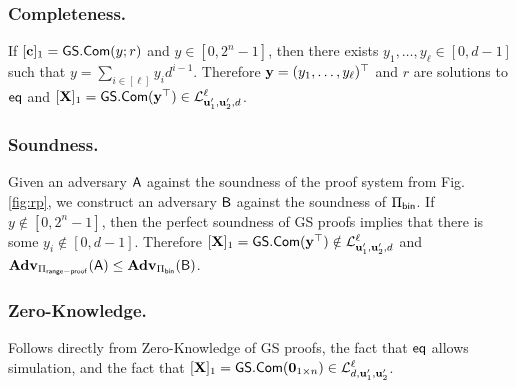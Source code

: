 \subsubsection{Completeness.}
If $[\mathbf{c}]_1={\mathsf{GS}}.\mathsf{Com}(y;r)$ and $y\in[0,2^n-1]$, then there exists $y_1,\ldots,y_\ell\in[0,d-1]$  such that $y=\sum_{i\in[\ell]}y_id^{i-1}$. Therefore $\mathbf{y}=(y_1,\ldots,y_\ell)^\top$ and $r$ are solutions to $\mathsf{eq}$ and $[\mathbf{{X}}]_1={\mathsf{GS}}.\mathsf{Com}(\mathbf{y}^\top)\in\mathcal{L}_{\mathbf{u}'_1,\mathbf{u}'_2,d}^\ell$.

\subsubsection{Soundness.}
Given an adversary $\mathsf{A}$ against the soundness of the proof system from Fig. \ref{fig:rp}, we construct an adversary $\mathsf{B}$ against the soundness of $\Pi_{\mathsf{bin}}$. If $y\notin[0,2^n-1]$, then the perfect soundness of GS proofs implies that there is some $y_i\notin[0,d-1]$. Therefore $[\mathbf{{X}}]_1={\mathsf{GS}}.\mathsf{Com}(\mathbf{y}^\top)\notin\mathcal{L}_{\mathbf{u}'_1,\mathbf{u}'_2,d}^\ell$ and $\mathbf{Adv}_{\Pi_\mathsf{range-proof}}(\mathsf{A})\leq\mathbf{Adv}_{\Pi_{\mathsf{bin}}}(\mathsf{B})$.

\subsubsection{Zero-Knowledge.} Follows directly from Zero-Knowledge of GS proofs, the fact that $\mathsf{eq}$ allows simulation, and the fact that $[\mathbf{{X}}]_1={\mathsf{GS}}.\mathsf{Com}(\mathbf{{0}}_{1\times n})\in\mathcal{L}_{d,\mathbf{u}'_1,\mathbf{u}'_2}^\ell$.
